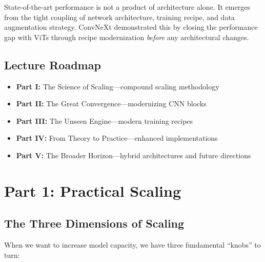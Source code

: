 \documentclass{article}
\begin{document}
\begin{tcolorbox}[colback=yellow!5!white, colframe=orange!50!black, title=The Deeper Truth]
State-of-the-art performance is not a product of architecture alone. It emerges from the tight coupling of network architecture, training recipe, and data augmentation strategy. ConvNeXt demonstrated this by closing the performance gap with ViTs through recipe modernization \textit{before} any architectural changes.
\end{tcolorbox}

\subsection{Lecture Roadmap}

\begin{itemize}
    \item \textbf{Part I:} The Science of Scaling---compound scaling methodology
    \item \textbf{Part II:} The Great Convergence---modernizing CNN blocks
    \item \textbf{Part III:} The Unseen Engine---modern training recipes
    \item \textbf{Part IV:} From Theory to Practice---enhanced implementations
    \item \textbf{Part V:} The Broader Horizon---hybrid architectures and future directions
\end{itemize}

\section{Part 1: Practical Scaling}

\subsection{The Three Dimensions of Scaling}

When we want to increase model capacity, we have three fundamental ``knobs'' to turn:
\end{document}
